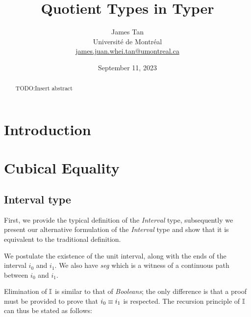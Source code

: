 \documentclass[11pt]{article}
\title{Quotient Types in Typer}
\author{James Tan \\ Université de Montréal \\ \href{mailto:james.juan.whei.tan@umontreal.ca}{james.juan.whei.tan@umontreal.ca}}
\date{September 11, 2023}
\newcommand\id[1] {\textsl{#1}}
\begin{document}
\maketitle

\begin{abstract}
  TODO:Insert abstract
\end{abstract}

\tableofcontents

\section{Introduction}

\section{Cubical Equality}
\subsection{Interval type}
First, we provide the typical definition of the \id{Interval} type, subsequently we present our alternative formulation of the \id{Interval} type and show that it is equivalent to the traditional definition.

\begin{prooftree*}
\end{prooftree*}

\begin{prooftree*}
\end{prooftree*}

\begin{prooftree*}
\end{prooftree*}

\begin{prooftree*}
\end{prooftree*}

We postulate the existence of the unit interval, along with the ends of the interval \id{$i_0$} and \id{$i_1$}. We also have \id{seg} which is a witness of a continuous path between \id{$i_0$} and \id{$i_1$}.

Elimination of $\mathbb{I}$ is similar to that of \id{Booleans}; the only difference is that a proof must be provided to prove that $\eqtype{i_0}{i_1}$ is respected. The recursion principle of $\mathbb{I}$ can thus be stated as follows:

\begin{prooftree*}
\end{prooftree*}
\end{document}
